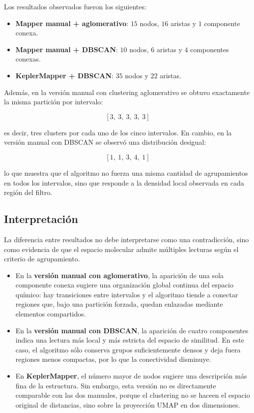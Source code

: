 \documentclass[12pt]{article}
\begin{document}
Los resultados observados fueron los siguientes:

\begin{itemize}
    \item \textbf{Mapper manual + aglomerativo}: $15$ nodos, $16$ aristas y $1$ componente conexa.
    \item \textbf{Mapper manual + DBSCAN}: $10$ nodos, $6$ aristas y $4$ componentes conexas.
    \item \textbf{KeplerMapper + DBSCAN}: $35$ nodos y $22$ aristas.
\end{itemize}

Adem\'as, en la versi\'on manual con clustering aglomerativo se obtuvo exactamente la misma partici\'on por intervalo:

\[
[3,\ 3,\ 3,\ 3,\ 3]
\]

es decir, tres clusters por cada uno de los cinco intervalos. En cambio, en la versi\'on manual con DBSCAN se observ\'o una distribuci\'on desigual:

\[
[1,\ 1,\ 3,\ 4,\ 1]
\]

lo que muestra que el algoritmo no fuerza una misma cantidad de agrupamientos en todos los intervalos, sino que responde a la densidad local observada en cada regi\'on del filtro.

\subsection{Interpretaci\'on}

La diferencia entre resultados no debe interpretarse como una contradicci\'on, sino como evidencia de que el espacio molecular admite m\'ultiples lecturas seg\'un el criterio de agrupamiento.

\begin{itemize}
    \item En la \textbf{versi\'on manual con aglomerativo}, la aparici\'on de una sola componente conexa sugiere una organizaci\'on global continua del espacio qu\'imico: hay transiciones entre intervalos y el algoritmo tiende a conectar regiones que, bajo una partici\'on forzada, quedan enlazadas mediante elementos compartidos.
    \item En la \textbf{versi\'on manual con DBSCAN}, la aparici\'on de cuatro componentes indica una lectura m\'as local y m\'as estricta del espacio de similitud. En este caso, el algoritmo s\'olo conserva grupos suficientemente densos y deja fuera regiones menos compactas, por lo que la conectividad disminuye.
    \item En \textbf{KeplerMapper}, el n\'umero mayor de nodos sugiere una descripci\'on m\'as fina de la estructura. Sin embargo, esta versi\'on no es directamente comparable con las dos manuales, porque el clustering no se haceen el espacio original de distancias, sino sobre la proyecci\'on UMAP en dos dimensiones.
\end{itemize}
\end{document}
